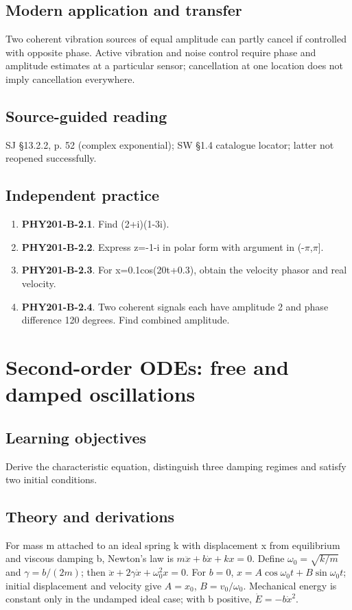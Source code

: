 \documentclass[11pt,a4paper,openany]{book}
\begin{document}
\section{Modern application and transfer}
Two coherent vibration sources of equal amplitude can partly cancel if controlled with opposite phase. Active vibration and noise control require phase and amplitude estimates at a particular sensor; cancellation at one location does not imply cancellation everywhere.
\section{Source-guided reading}
SJ §13.2.2, p. 52 (complex exponential); SW §1.4 catalogue locator; latter not reopened successfully.
\section{Independent practice}
\begin{enumerate}
\item \textbf{PHY201-B-2.1}. Find (2+i)(1-3i).
\item \textbf{PHY201-B-2.2}. Express z=-1-i in polar form with argument in (-\ensuremath{\pi},\ensuremath{\pi}].
\item \textbf{PHY201-B-2.3}. For x=0.1cos(20t+0.3), obtain the velocity phasor and real velocity.
\item \textbf{PHY201-B-2.4}. Two coherent signals each have amplitude 2 and phase difference 120 degrees. Find combined amplitude.
\end{enumerate}
\chapter{Second-order ODEs: free and damped oscillations}
\section{Learning objectives}
Derive the characteristic equation, distinguish three damping regimes and satisfy two initial conditions.
\section{Theory and derivations}
For mass m attached to an ideal spring k with displacement x from equilibrium and viscous damping b, Newton's law is $m\ddot x+b\dot x+kx=0$. Define $\omega_0=\sqrt{k/m}$ and $\gamma=b/(2m)$; then $\ddot x+2\gamma\dot x+\omega_0^2x=0$. For $b=0$, $x=A\cos\omega_0t+B\sin\omega_0t$; initial displacement and velocity give $A=x_0$, $B=v_0/\omega_0$. Mechanical energy is constant only in the undamped ideal case; with b positive, $\dot E=-b\dot x^2$.
\end{document}
